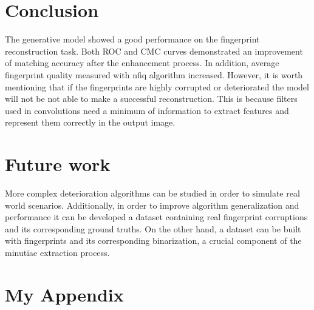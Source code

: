 \documentclass[a4paper,fleqn]{cas-dc}
\begin{document}
\section{Conclusion}
\label{sec:CON}

The generative model showed a good performance on the fingerprint reconstruction task. Both ROC and CMC curves demonstrated an improvement of matching accuracy after the enhancement process. In addition, average fingerprint quality measured with nfiq algorithm increased. However, it is worth mentioning that if the fingerprints are highly corrupted or deteriorated the model will not be not able to make a successful reconstruction. This is because filters used in convolutions need a minimum of information to extract features and represent them correctly in the output image.


\section{Future work}
\label{sec:FW}

More complex deterioration algorithms can be studied in order to simulate real world scenarios. Additionally, in order to improve algorithm generalization and performance it can be developed a dataset containing real fingerprint corruptions and its corresponding ground truths. On the other hand, a dataset can be built with fingerprints and its corresponding binarization, a crucial component of the minutiae extraction process.

\printcredits

%






\onecolumn
\appendix
\section{My Appendix}
\end{document}
